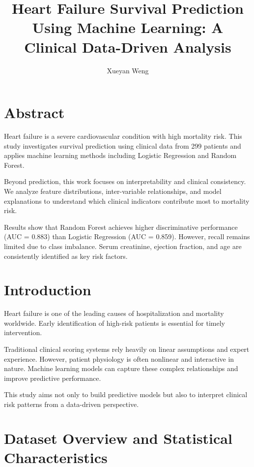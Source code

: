 \documentclass[11pt]{article}
\title{Heart Failure Survival Prediction Using Machine Learning: A Clinical Data-Driven Analysis}
\author{Xueyan Weng}
\date{}
\begin{document}
	
	\maketitle
	
	\section{Abstract}
	
	Heart failure is a severe cardiovascular condition with high mortality risk. This study investigates survival prediction using clinical data from 299 patients and applies machine learning methods including Logistic Regression and Random Forest.
	
	Beyond prediction, this work focuses on interpretability and clinical consistency. We analyze feature distributions, inter-variable relationships, and model explanations to understand which clinical indicators contribute most to mortality risk.
	
	Results show that Random Forest achieves higher discriminative performance (AUC = 0.883) than Logistic Regression (AUC = 0.859). However, recall remains limited due to class imbalance. Serum creatinine, ejection fraction, and age are consistently identified as key risk factors.
	
	\section{Introduction}
	
	Heart failure is one of the leading causes of hospitalization and mortality worldwide. Early identification of high-risk patients is essential for timely intervention.
	
	Traditional clinical scoring systems rely heavily on linear assumptions and expert experience. However, patient physiology is often nonlinear and interactive in nature. Machine learning models can capture these complex relationships and improve predictive performance.
	
	This study aims not only to build predictive models but also to interpret clinical risk patterns from a data-driven perspective.
	
	\section{Dataset Overview and Statistical Characteristics}
	
\end{document}
